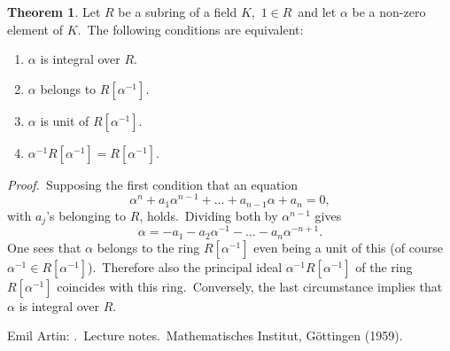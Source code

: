 \documentclass[12pt]{article}
\theoremstyle{definition}
\newtheorem*{thmplain}{Theorem}
\begin{document}
\begin{thmplain}
Let $R$ be a subring of a field $K$,\, $1\in R$\, and let $\alpha$ be a non-zero element of $K$.\, The following conditions are equivalent:
\begin{enumerate}
 \item $\alpha$ is integral over $R$.
 \item $\alpha$ belongs to $R[\alpha^{-1}]$.
 \item $\alpha$ is unit of $R[\alpha^{-1}]$.
 \item $\alpha^{-1}R[\alpha^{-1}] = R[\alpha^{-1}]$.
\end{enumerate}
\end{thmplain}

{\em Proof.} \,Supposing the first condition  that an equation
          $$\alpha^n+a_1\alpha^{n-1}+\ldots+a_{n-1}\alpha+a_n = 0,$$
with $a_j$'s belonging to $R$, holds.\, Dividing both  by $\alpha^{n-1}$ gives 
          $$\alpha = -a_1-a_2\alpha^{-1}-\ldots-a_n\alpha^{-n+1}.$$
One sees that $\alpha$ belongs to the ring $R[\alpha^{-1}]$ even being a unit of this (of course \,$\alpha^{-1}\in R[\alpha^{-1}]$).\, Therefore also the principal ideal $\alpha^{-1}R[\alpha^{-1}]$ of the ring $R[\alpha^{-1}]$ coincides with this ring.\, Conversely, the last circumstance implies that $\alpha$ is integral over $R$.

\begin{thebibliography}{7}
 Emil Artin: {\em {}}.\, Lecture notes.\, Mathematisches Institut, G\"ottingen (1959).
\end{thebibliography}
\end{document}
